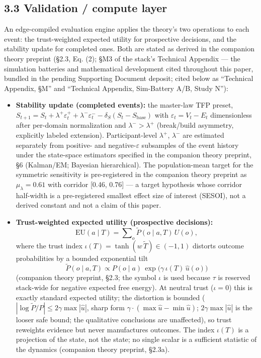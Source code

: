 \documentclass[11pt,twocolumn]{article}
\providecommand{\tightlist}{\setlength{\itemsep}{0pt}\setlength{\parskip}{0pt}}
\begin{document}
\subsection*{3.3 Validation / compute
layer}

An edge-compiled evaluation engine applies the theory's two operations
to each event: the trust-weighted expected utility for prospective
decisions, and the stability update for completed ones. Both are stated
as derived in the companion theory preprint (§2.3, Eq. (2); §M3 of the
stack's Technical Appendix --- the simulation batteries and mathematical
development cited throughout this paper, bundled in the pending
Supporting Document deposit; cited below as
``Technical Appendix, §M'' and ``Technical Appendix, Sim-Battery A/B,
Study N''):

\begin{itemize}
\tightlist
\item
  \textbf{Stability update (completed events):} the master-law TFP
  preset,
  \(S_{t+1} = S_t + \lambda^{+}\varepsilon_t^{+} + \lambda^{-}\varepsilon_t^{-} - \delta_S(S_t - S_{\mathrm{base}})\)
  with \(\varepsilon_t = V_t - E_t\) dimensionless after per-domain
  normalization and \(\lambda^{-} > \lambda^{+}\) (break/build
  asymmetry, explicitly labeled extension). Participant-level
  \(\lambda^{+}\), \(\lambda^{-}\) are estimated separately from
  positive- and negative-\(\varepsilon\) subsamples of the event history
  under the state-space estimators specified in the companion theory preprint, §6 (Kalman/EM;
  Bayesian hierarchical). The population-mean target for the symmetric
  sensitivity is pre-registered in the companion theory preprint as \(\mu_{\lambda} = 0.61\) with corridor
  {[}0.46, 0.76{]} --- a target hypothesis whose corridor half-width is
  a pre-registered smallest effect size of interest (SESOI), not a
  derived constant and not a claim of this paper.
\item
  \textbf{Trust-weighted expected utility (prospective decisions):}
  \begin{equation} \mathrm{EU}(a \mid T) = \sum\nolimits_o \tilde{P}(o \mid a, T)\,U(o), \label{eq:eu} \end{equation} where the trust index
  \(\iota(T) = \tanh(w\,\tilde{T}) \in (-1, 1)\) distorts outcome
  probabilities by a bounded exponential tilt \begin{equation} \tilde{P}(o \mid a, T) \propto P(o \mid a)\,\exp\bigl(\gamma\,\iota(T)\,\hat{u}(o)\bigr) \label{eq:tilt} \end{equation} (companion theory preprint, §2.3; the
  symbol \(\iota\) is used because \(\tau\) is reserved stack-wide for
  negative expected free energy). At neutral trust (\(\iota = 0\)) this
  is exactly standard expected utility; the distortion is bounded
  (\(|\log \tilde{P}/P| \leq 2\gamma \max|\hat{u}|\), sharp form
  \(\gamma\cdot(\max\hat{u} - \min\hat{u})\); \(2\gamma \max|\hat{u}|\)
  is the looser safe bound; the qualitative conclusions are unaffected), so trust reweights
  evidence but never manufactures outcomes. The index \(\iota(T)\) is a
  projection of the state, not the state; no single scalar is a
  sufficient statistic of the dynamics (companion theory preprint, §2.3a).
\end{itemize}
\end{document}
